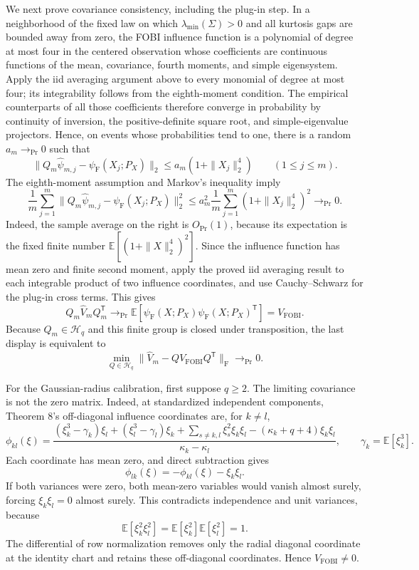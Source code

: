 We next prove covariance consistency, including the plug-in step. In a neighborhood of the fixed law on which \(\lambda_{\min}(\Sigma)>0\) and all kurtosis gaps are bounded away from zero, the FOBI influence function is a polynomial of degree at most four in the centered observation whose coefficients are continuous functions of the mean, covariance, fourth moments, and simple eigensystem. Apply the iid averaging argument above to every monomial of degree at most four; its integrability follows from the eighth-moment condition. The empirical counterparts of all those coefficients therefore converge in probability by continuity of inversion, the positive-definite square root, and simple-eigenvalue projectors. Hence, on events whose probabilities tend to one, there is a random \(a_m\to_{\Pr}0\) such that
\[
 \|Q_m\widehat\psi_{m,j}-\psi_{\mathrm F}(X_j;P_X)\|_2
 \leq a_m(1+\|X_j\|_2^4)
 \qquad(1\leq j\leq m).
\]
The eighth-moment assumption and Markov's inequality imply
\[
 \frac1m\sum_{j=1}^m
 \|Q_m\widehat\psi_{m,j}-\psi_{\mathrm F}(X_j;P_X)\|_2^2
 \leq
 a_m^2\frac1m\sum_{j=1}^m(1+\|X_j\|_2^4)^2
 \longrightarrow_{\Pr}0.
\]
Indeed, the sample average on the right is \(O_{\Pr}(1)\), because its expectation is the fixed finite number \(\mathbb E[(1+\|X\|_2^4)^2]\). Since the influence function has mean zero and finite second moment, apply the proved iid averaging result to each integrable product of two influence coordinates, and use Cauchy--Schwarz for the plug-in cross terms. This gives
\[
 Q_m\widehat V_mQ_m^{\mathsf T}
 \longrightarrow_{\Pr}
 \mathbb E[\psi_{\mathrm F}(X;P_X)\psi_{\mathrm F}(X;P_X)^{\mathsf T}]
 =V_{\mathrm{FOBI}}.
\]
Because \(Q_m\in\mathcal H_q\) and this finite group is closed under transposition, the last display is equivalent to
\[
 \min_{Q\in\mathcal H_q}
 \|\widehat V_m-QV_{\mathrm{FOBI}}Q^{\mathsf T}\|_{\mathrm F}
 \longrightarrow_{\Pr}0.
\]

For the Gaussian-radius calibration, first suppose \(q\geq2\). The limiting covariance is not the zero matrix. Indeed, at standardized independent components, Theorem 8's off-diagonal influence coordinates are, for \(k\neq l\),
\[
 \phi_{kl}(\xi)
 =\frac{
 (\xi_k^3-\gamma_k)\xi_l+(\xi_l^3-\gamma_l)\xi_k
 +\sum_{s\neq k,l}\xi_s^2\xi_k\xi_l
 -(\kappa_k+q+4)\xi_k\xi_l
 }{\kappa_k-\kappa_l},
 \qquad
 \gamma_k=\mathbb E[\xi_k^3].
\]
Each coordinate has mean zero, and direct subtraction gives
\[
 \phi_{lk}(\xi)=-\phi_{kl}(\xi)-\xi_k\xi_l.
\]
If both variances were zero, both mean-zero variables would vanish almost surely, forcing \(\xi_k\xi_l=0\) almost surely. This contradicts independence and unit variances, because
\[
 \mathbb E[\xi_k^2\xi_l^2]
 =\mathbb E[\xi_k^2]\mathbb E[\xi_l^2]=1.
\]
The differential of row normalization removes only the radial diagonal coordinate at the identity chart and retains these off-diagonal coordinates. Hence \(V_{\mathrm{FOBI}}\neq0\).

